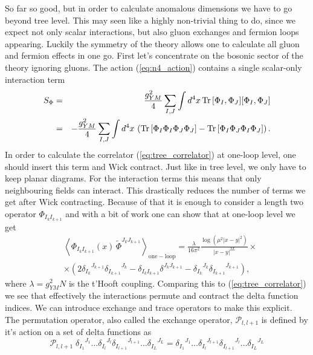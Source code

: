 So far so good, but in order to calculate anomalous dimensions we have to go beyond tree level. 
This may seen like a highly non-trivial thing to do, since we expect not only scalar interactions, but also gluon exchanges and fermion loops appearing. 
Luckily the symmetry of the theory allows one to calculate all gluon and fermion effects in one go. 
First let's concentrate on the bosonic sector of the theory ignoring gluons. 
The action (\ref{eq:n4_action}) contains a single scalar-only interaction term
\begin{eqnarray}
S_{\Phi} & = &  \frac{g_{YM}^2}{4} \sum_{I,J} \int d^4 x \, \mathrm{Tr} \, [\Phi_I, \Phi_J] [\Phi_I, \Phi_J] \nonumber \\
& = & - \frac{g_{YM}^2}{4} \sum_{I,J} \int d^4 x \, \left( \mathrm{Tr} \, [\Phi_I\Phi_I\Phi_J\Phi_J] - \mathrm{Tr} \, [\Phi_I\Phi_J\Phi_I\Phi_J]  \right).
\end{eqnarray} 
In order to calculate the correlator (\ref{eq:tree_correlator}) at one-loop level, one should insert this term and Wick contract. 
Just like in tree level, we only have to keep planar diagrams. 
For the interaction terms this means that only neighbouring fields can interact. 
This drastically reduces the number of terms we get after Wick contracting. 
Because of that it is enough to consider a length two operator $\Phi_{I_k I_{k+1}}$ and with a bit of work one can show that at one-loop level we get
\begin{eqnarray}
	 & \left< \Phi_{I_k I_{k+1}}(x) \, \tilde{\Phi}^{J_k J_{k+1}} \right>_{\mathrm{one-loop}}  = \frac{\lambda}{16\pi^2} \frac{\log (\mu^2|x-y|^2)}{|x-y|^{2L}} \times \nonumber \\ 
	& \times  \left( 2 {\delta_{I_k}}^{J_{k+1}} {\delta_{I_{k+1}}}^{J_{k}} - \delta_{I_k I_{k+1}} \delta^{J_k J_{k+1}} - {\delta_{I_k}}^{J_{k}} {\delta_{I_{k+1}}}^{J_{k+1}} \right),
	\label{eq:loop_correlator}
\end{eqnarray}
where $\lambda = g_{YM}^2 N$ is the t'Hooft coupling. 
Comparing this to (\ref{eq:tree_correlator}) we see that effectively the interactions permute and contract the delta function indices. 
We can introduce exchange and trace operators to make this explicit. 
The permutation operator, also called the exchange operator, $\mathcal{P}_{l,l+1}$ is defined by it's action on a set of delta functions as
\begin{equation}
	\mathcal{P}_{l,l+1} \; {\delta_{I_{1}}}^{J_{1}} \dots {\delta_{I_{l}}}^{J_{l}} {\delta_{I_{l+1}}}^{J_{l+1}} \dots {\delta_{I_{L}}}^{J_{L}} = {\delta_{I_{1}}}^{J_{1}} \dots {\delta_{I_{l}}}^{J_{l+1}} {\delta_{I_{l+1}}}^{J_{l}} \dots {\delta_{I_{L}}}^{J_{L}}
\end{equation}
